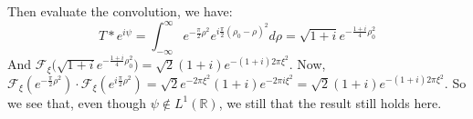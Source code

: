 \documentclass[crop=false,class=book,oneside]{standalone}
\begin{document}
            \par\hfill\par
            Then evaluate the convolution, we have:
            \begin{equation}
                T*e^{i\psi}=
                \int_{-\infty}^{\infty}
                e^{-\frac{\pi}{2}\rho^2}
                e^{i\frac{\pi}{2}(\rho_0-\rho)^2}d\rho
                =\sqrt{1+i}e^{-\frac{1+i}{4}\rho_0^2}
            \end{equation}
            And $\mathcal{F}_{\xi}\big(\sqrt{1+i}e^{-\frac{1+i}{4}\rho_0^2}\big) = \sqrt{2}(1+i)e^{-(1+i)2\pi \xi^2}$. Now, $\mathcal{F}_{\xi}(e^{-\frac{\pi}{2}\rho^2})\cdot \mathcal{F}_{\xi}(e^{i\frac{\pi}{2}\rho^2}) = \sqrt{2}e^{-2\pi \xi^2}(1+i)e^{-2\pi i \xi^2} = \sqrt{2}(1+i)e^{-(1+i)2\pi \xi^2}$. So we see that, even though $\psi \notin L^{1}(\mathbb{R})$, we still that the result still holds here. 
\end{document}
